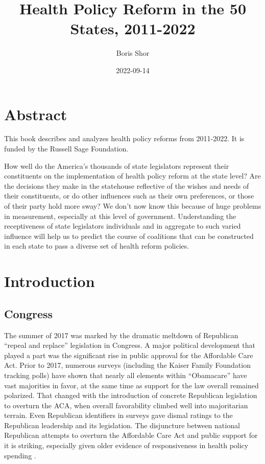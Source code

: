 \documentclass[
  oneside]{book}
\title{Health Policy Reform in the 50 States, 2011-2022}
\author{Boris Shor}
\date{2022-09-14}
\begin{document}
\maketitle

{
\setcounter{tocdepth}{1}
\tableofcontents
}
\hypertarget{abstract}{%
\chapter{Abstract}\label{abstract}}

This book describes and analyzes health policy reforms from 2011-2022. It is funded by the Russell Sage Foundation.

How well do the America's thousands of state legislators represent their constituents on the implementation of health policy reform at the state level? Are the decisions they make in the statehouse reflective of the wishes and needs of their constituents, or do other influences such as their own preferences, or those of their party hold more sway? We don't now know this because of huge problems in measurement, especially at this level of government. Understanding the receptiveness of state legislators individuals and in aggregate to such varied influence will help us to predict the course of coalitions that can be constructed in each state to pass a diverse set of health reform policies.

\hypertarget{intro}{%
\chapter{Introduction}\label{intro}}

\hypertarget{congress}{%
\section{Congress}\label{congress}}

The summer of 2017 was marked by the dramatic meltdown of Republican ``repeal and replace'' legislation in Congress. A major political development that played a part was the significant rise in public approval for the Affordable Care Act. Prior to 2017, numerous surveys (including the Kaiser Family Foundation tracking polls) have shown that nearly all elements within ``Obamacare'' have vast majorities in favor, at the same time as support for the law overall remained polarized. That changed with the introduction of concrete Republican legislation to overturn the ACA, when overall favorability climbed well into majoritarian terrain. Even Republican identifiers in surveys gave dismal ratings to the Republican leadership and its legislation. The disjuncture between national Republican attempts to overturn the Affordable Care Act and public support for it is striking, especially given older evidence of responsiveness in health policy spending \citep{Soroka:2003, Wlezien:2004}.
\end{document}
